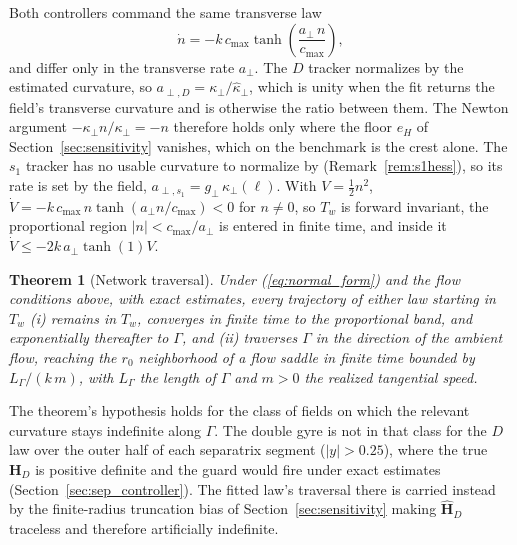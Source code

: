 \documentclass[lettersize,journal]{IEEEtran}
\newtheorem{theorem}{Theorem}
\begin{document}
Both controllers command the same transverse law
\begin{equation}
    \dot{n} = -k\,c_{\max}\tanh\!\left(
        \frac{a_\perp\,n}{c_{\max}}\right),
    \label{eq:n_dynamics}
\end{equation}
and differ only in the transverse rate $a_\perp$. The $D$ tracker
normalizes by the estimated curvature, so $a_{\perp,D} = \kappa_\perp /
\hat{\kappa}_\perp$, which is unity when the fit returns the field's
transverse curvature and is otherwise the ratio between them. The
Newton argument $-\kappa_\perp n/\kappa_\perp = -n$ therefore holds only
where the floor $e_H$ of Section~\ref{sec:sensitivity} vanishes, which on
the benchmark is the crest alone. The $s_1$ tracker has no usable curvature to normalize by
(Remark~\ref{rem:s1hess}), so its rate is set by the field,
$a_{\perp,s_1} = g_\perp\,\kappa_\perp(\ell)$.
With $V = \tfrac{1}{2}n^2$, $\dot{V} = -k\,c_{\max}\,n\tanh(a_\perp
n/c_{\max}) < 0$ for $n \neq 0$, so $T_w$ is forward invariant, the
proportional region $|n| < c_{\max}/a_\perp$ is entered in finite time,
and inside it $\dot{V} \leq -2k\,a_\perp\tanh(1)V$.

\begin{theorem}[Network traversal]
\label{thm:separatrix}
Under (\ref{eq:normal_form}) and the flow conditions above, with exact
estimates, every
trajectory of either law starting in $T_w$ (i) remains in $T_w$, converges
in finite time to the proportional band, and exponentially thereafter to $\Gamma$, and (ii) traverses $\Gamma$ in the direction
of the ambient flow, reaching the $r_0$ neighborhood of a flow saddle in
finite time bounded by $L_\Gamma/(k\,m)$, with $L_\Gamma$ the length of
$\Gamma$ and $m > 0$ the realized tangential speed.
\end{theorem}

The theorem's hypothesis holds for the class of fields on which the
relevant curvature stays indefinite along $\Gamma$. The double gyre is
not in that class for the $D$ law over the outer half of each separatrix
segment ($|y| > 0.25$), where the true $\mathbf{H}_D$ is positive
definite and the guard would fire under exact estimates
(Section~\ref{sec:sep_controller}). The fitted law's traversal there is
carried instead by the finite-radius truncation bias of
Section~\ref{sec:sensitivity} making $\hat{\mathbf{H}}_D$ traceless and
therefore artificially indefinite.
\end{document}

